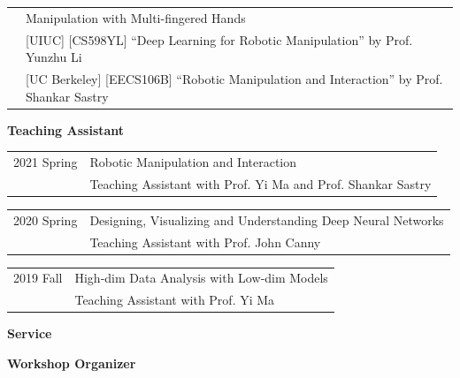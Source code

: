 \documentclass{resume}
\newlength{\myvertspace}
\newcommand{\vs}{ \vspace{\myvertspace} }
\begin{document}
{\renewcommand{\arraystretch}{1.1}
\begin{tabular}{@{}L{2.1cm}l@{}}
{} & {Manipulation with Multi-fingered Hands} \\  [-0.05cm]
& {\small [UIUC] [CS598YL] ``Deep Learning for Robotic Manipulation'' by Prof. Yunzhu Li} \\ [-0.05cm]
& {\small [UC Berkeley] [EECS106B] ``Robotic Manipulation and Interaction'' by Prof. Shankar Sastry}
\end{tabular}} 

{\bf Teaching Assistant}

{\renewcommand{\arraystretch}{1.1}
\begin{tabular}{@{}L{2.1cm}l@{}}
{2021 Spring} & {Robotic Manipulation and Interaction} \\
& {Teaching Assistant with Prof. Yi Ma and Prof. Shankar Sastry}
\end{tabular}}

{\renewcommand{\arraystretch}{1.1}
\begin{tabular}{@{}L{2.1cm}l@{}}
{2020 Spring} & {Designing, Visualizing and Understanding Deep Neural Networks} \\
& {Teaching Assistant with Prof. John Canny}
\end{tabular}}

{\renewcommand{\arraystretch}{1.1}
\begin{tabular}{@{}L{2.1cm}l@{}}
{2019 Fall} & {High‑dim Data Analysis with Low‑dim Models} \\
& {Teaching Assistant with Prof. Yi Ma}
\end{tabular}}

\vs
{\bf \large Service}
\vs

{\bf Workshop Organizer}
\end{document}
